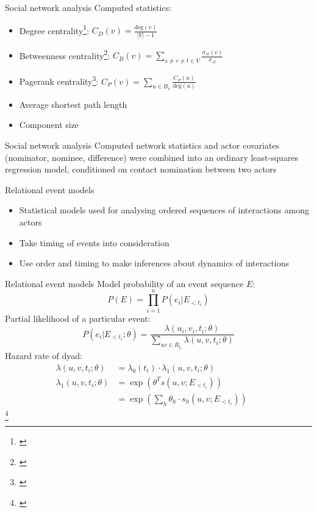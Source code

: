 \documentclass{beamer}
\begin{document}
	\begin{frame}{Social network analysis}
		Computed statistics:
		\begin{itemize}
			\item Degree centrality\footnote{\cite{golbeck}}: $C_D(v) = \frac{\text{deg}(v)}{\lvert V \rvert - 1}$
			\item Betweenness centrality\footnote{\cite{golbeck}}: $C_B(v) = \sum_{s\neq v\neq t\in V}\frac{\sigma_{st}(v)}{\sigma_{st}}$
			\item Pagerank centrality\footnote{\cite{gleich_pagerank}}: $C_P(v) = \sum_{u \in B_v}\frac{C_P(u)}{\text{deg}(u)}$
			\item Average shortest path length
			\item Component size
		\end{itemize}
	\end{frame}

	\begin{frame}{Social network analysis}
		Computed network statistics and actor covariates (nominator, nominee, difference) were combined into an ordinary least-squares regression model, conditioned on contact nomination between two actors
	\end{frame}

	\begin{frame}{Relational event models}
		\begin{itemize}
			\item Statistical models used for analysing ordered sequences of interactions among actors
			\item Take timing of events into consideration
			\item Use order and timing to make inferences about dynamics of interactions
		\end{itemize}
	\end{frame}

	\begin{frame}{Relational event models}
		Model probability of an event sequence $E$:
		\begin{equation*}
			P(E) = \prod_{i=1}^{n}P(e_i|E_{<t_i})
		\end{equation*}
		Partial likelihood of a particular event:
		\begin{equation*}
			P(e_i|E_{<t_i};\theta) = \frac{\lambda(u_i,v_i,t_i;\theta)}{\sum_{uv\in R_{t_i}}\lambda(u,v,t_i;\theta)}
		\end{equation*}
		Hazard rate of dyad:
		\begin{align*}
			\lambda(u,v,t_i;\theta) &= \lambda_0(t_i) \cdot \lambda_1(u,v,t_i;\theta)\\
			\lambda_1(u,v,t_i;\theta) &= \exp(\theta^T s(u,v;E_{<t_i}))\\
			&= \exp(\sum_h \theta_h \cdot s_h(u,v;E_{<t_i}))&&
		\end{align*}\footnote{\cite{butts20084,pilny_rem,stadtfeld2017interactions}}
	\end{frame}
\end{document}
